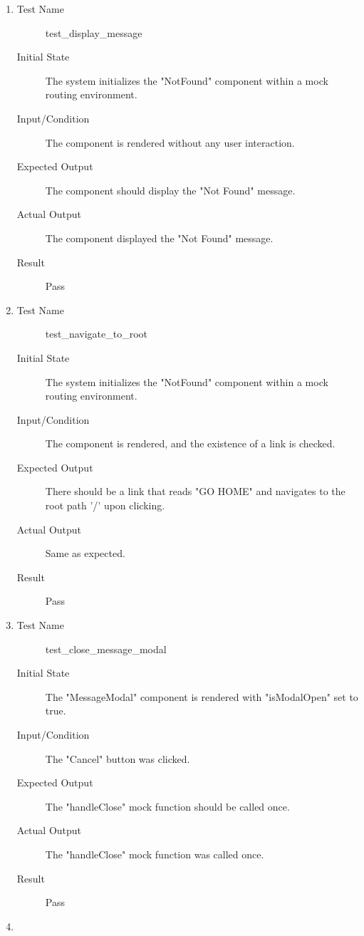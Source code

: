 \documentclass[12pt, titlepage]{article}
\begin{document}
\begin{enumerate}[UT-OT1]
\item \label{UT-OT1}
  \begin{description}
  \item[Test Name] test\_display\_message
  \item[Initial State] The system initializes the "NotFound" component within a
    mock routing environment.
  \item[Input/Condition] The component is rendered without any user interaction.
  \item[Expected Output] The component should display the "Not Found" message.
  \item[Actual Output] The component displayed the "Not Found" message.
  \item[Result] Pass
  \end{description}
\item \label{UT-OT2}
  \begin{description}
  \item[Test Name] test\_navigate\_to\_root
  \item[Initial State] The system initializes the "NotFound" component within a
    mock routing environment.
  \item[Input/Condition] The component is rendered, and the existence of a link
    is checked.
  \item[Expected Output] There should be a link that reads "GO HOME" and
    navigates to the root path '/' upon clicking.
  \item[Actual Output] Same as expected.
  \item[Result] Pass
  \end{description}
\item \label{UT-OT3}
  \begin{description}
  \item[Test Name] test\_close\_message\_modal
  \item[Initial State] The "MessageModal" component is rendered with
    "isModalOpen" set to true.
  \item[Input/Condition] The "Cancel" button was clicked.
  \item[Expected Output] The "handleClose" mock function should be called once.
  \item[Actual Output] The "handleClose" mock function was called once.
  \item[Result] Pass
  \end{description}
\item \label{UT-OT4}

\end{enumerate}
\end{document}
